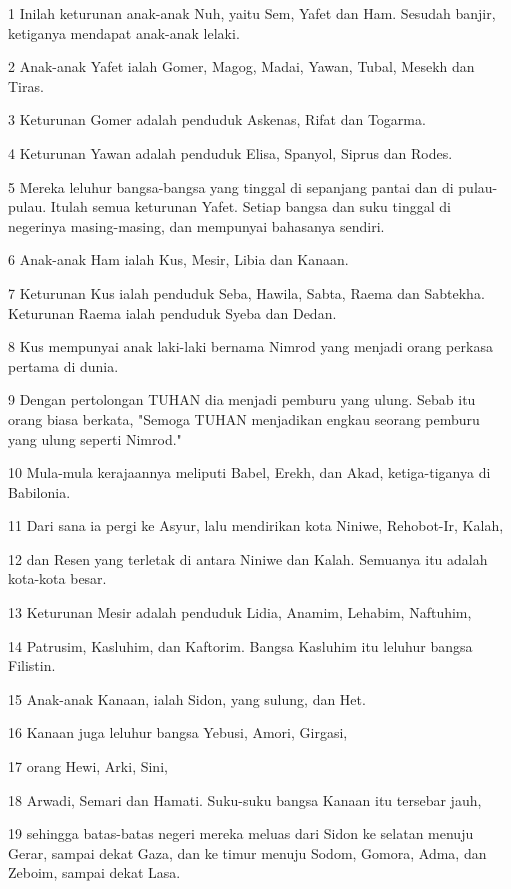 \par 1 Inilah keturunan anak-anak Nuh, yaitu Sem, Yafet dan Ham. Sesudah banjir, ketiganya mendapat anak-anak lelaki.
\par 2 Anak-anak Yafet ialah Gomer, Magog, Madai, Yawan, Tubal, Mesekh dan Tiras.
\par 3 Keturunan Gomer adalah penduduk Askenas, Rifat dan Togarma.
\par 4 Keturunan Yawan adalah penduduk Elisa, Spanyol, Siprus dan Rodes.
\par 5 Mereka leluhur bangsa-bangsa yang tinggal di sepanjang pantai dan di pulau-pulau. Itulah semua keturunan Yafet. Setiap bangsa dan suku tinggal di negerinya masing-masing, dan mempunyai bahasanya sendiri.
\par 6 Anak-anak Ham ialah Kus, Mesir, Libia dan Kanaan.
\par 7 Keturunan Kus ialah penduduk Seba, Hawila, Sabta, Raema dan Sabtekha. Keturunan Raema ialah penduduk Syeba dan Dedan.
\par 8 Kus mempunyai anak laki-laki bernama Nimrod yang menjadi orang perkasa pertama di dunia.
\par 9 Dengan pertolongan TUHAN dia menjadi pemburu yang ulung. Sebab itu orang biasa berkata, "Semoga TUHAN menjadikan engkau seorang pemburu yang ulung seperti Nimrod."
\par 10 Mula-mula kerajaannya meliputi Babel, Erekh, dan Akad, ketiga-tiganya di Babilonia.
\par 11 Dari sana ia pergi ke Asyur, lalu mendirikan kota Niniwe, Rehobot-Ir, Kalah,
\par 12 dan Resen yang terletak di antara Niniwe dan Kalah. Semuanya itu adalah kota-kota besar.
\par 13 Keturunan Mesir adalah penduduk Lidia, Anamim, Lehabim, Naftuhim,
\par 14 Patrusim, Kasluhim, dan Kaftorim. Bangsa Kasluhim itu leluhur bangsa Filistin.
\par 15 Anak-anak Kanaan, ialah Sidon, yang sulung, dan Het.
\par 16 Kanaan juga leluhur bangsa Yebusi, Amori, Girgasi,
\par 17 orang Hewi, Arki, Sini,
\par 18 Arwadi, Semari dan Hamati. Suku-suku bangsa Kanaan itu tersebar jauh,
\par 19 sehingga batas-batas negeri mereka meluas dari Sidon ke selatan menuju Gerar, sampai dekat Gaza, dan ke timur menuju Sodom, Gomora, Adma, dan Zeboim, sampai dekat Lasa.
